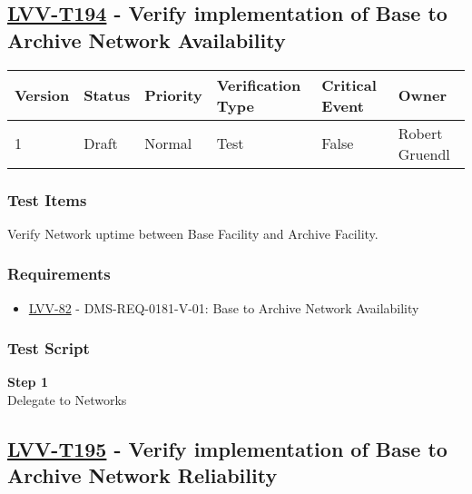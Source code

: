 \hypertarget{lvv-t194---verify-implementation-of-base-to-archive-network-availability}{\subsection{\texorpdfstring{\href{https://jira.lsstcorp.org/secure/Tests.jspa\#/testCase/LVV-T194}{LVV-T194}
- Verify implementation of Base to Archive Network
Availability}{LVV-T194 - Verify implementation of Base to Archive Network Availability}}\label{lvv-t194---verify-implementation-of-base-to-archive-network-availability}}

\begin{longtable}[]{@{}llllll@{}}
\toprule
Version & Status & Priority & Verification Type & Critical Event &
Owner\tabularnewline
\midrule
\endhead
1 & Draft & Normal & Test & False & Robert Gruendl\tabularnewline
\bottomrule
\end{longtable}

\subsubsection{Test Items}\label{test-items-53}

Verify Network uptime between Base Facility and Archive Facility.

\subsubsection{Requirements}\label{requirements-53}

\begin{itemize}
\tightlist
\item
  \href{https://jira.lsstcorp.org/browse/LVV-82}{LVV-82} -
  DMS-REQ-0181-V-01: Base to Archive Network Availability
\end{itemize}

\subsubsection{Test Script}\label{test-script-53}

\textbf{Step 1}\\
Delegate to Networks\\[2\baselineskip]

\hypertarget{lvv-t195---verify-implementation-of-base-to-archive-network-reliability}{\subsection{\texorpdfstring{\href{https://jira.lsstcorp.org/secure/Tests.jspa\#/testCase/LVV-T195}{LVV-T195}
- Verify implementation of Base to Archive Network
Reliability}{LVV-T195 - Verify implementation of Base to Archive Network Reliability}}\label{lvv-t195---verify-implementation-of-base-to-archive-network-reliability}}

